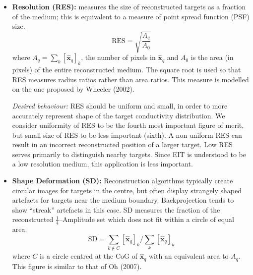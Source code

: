 \documentclass[12pt]{iopart}
\newcommand{\xH}{\mbox{$\mathbf{\hat x}$}}
\begin{document}
\begin{itemize}
\hspace{5mm}
{\em Desired behaviour:}
PE should be small and show small variability for
targets at different radial positions. We consider
small and constant PE to be the second most important
figure of merit. If PE is variable, interpretation
of a distribution of air in the lungs becomes unreliable.
Sheffield backprojection has large PE near the
electrodes, and this has resulted in cases where changes at
the electrodes are misinterpreted as being inside the body.

\item
{\bf Resolution (RES):}
measures the size of reconstructed targets as a fraction
of the medium; this is
equivalent to a measure of point spread function (PSF) size.
\begin{equation}
\mathrm{RES} = \sqrt{
 \frac{ A_q }
      { A_0 }
 }
\end{equation}
where $A_q =  \sum_k [\xH_q]_k$, the number
of pixels in $\xH_q$ and 
$A_0$ is the area (in pixels) of
the entire reconstructed medium. The square root is used 
so that RES measures radius ratios rather than area ratios.
This measure is modelled on the one proposed by
Wheeler \etal (2002).

\hspace{5mm}
{\em Desired behaviour:}
RES should be uniform and small, in order to 
more accurately represent shape of the target conductivity
distribution. We consider uniformity of RES to be the
fourth most important figure of merit, but small size
of RES to be less important (sixth). A non-uniform
RES can result in an incorrect reconstructed 
position of a larger target. Low RES serves primarily
to distinguish nearby targets. Since EIT is understood to
be a low resolution medium, this application is less important.

\item
{\bf Shape Deformation (SD):}
Reconstruction algorithms typically create circular
images for targets in the centre, but often display 
strangely shaped artefacts for targets near the medium
boundary. Backprojection tends to show ``streak''
artefacts in this case.
SD measures the fraction of the reconstructed
$\frac{1}{4}$--Amplitude set which does not
fit within a circle of equal area.
\begin{equation}
\mathrm{SD} = \sum_{k\not\in C} [\xH_q]_k / 
              \sum_{k} [\xH_q]_k
\end{equation}
where $C$ is a circle centred at the CoG of $\xH_q$
with an equivalent area to $A_q$. This figure
is similar to that of Oh \etal (2007).


\end{itemize}
\end{document}
